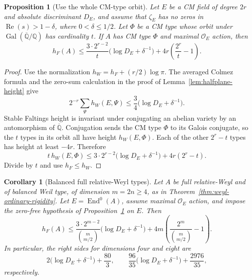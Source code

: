 \documentclass[11pt]{article}
\newtheorem{proposition}[theorem]{Proposition}
\newtheorem{corollary}[theorem]{Corollary}
\theoremstyle{definition}
\theoremstyle{remark}
\begin{document}
\begin{proposition}[Use the whole CM-type orbit]
\label{prop:cm-type-orbit-height}
Let $E$ be a CM field of degree $2r$ and absolute discriminant $D_E$,
and assume that $\zeta_E$ has no zeros in
$\operatorname{Re}(s)>1-\delta$, where $0<\delta\leq1/2$.
Let $\Phi$ be a CM type whose orbit under
$\operatorname{Gal}(\overline{\mathbb Q}/\mathbb Q)$ has cardinality
$t$.  If $A$ has CM type $\Phi$ and maximal $\mathcal O_E$ action,
then
\begin{equation}
 \label{eq:cm-type-orbit-height}
 h_F(A)\leq
 \frac{3\cdot2^{r-2}}{t}
       \bigl(\log D_E+\delta^{-1}\bigr)
 +4r\left(\frac{2^r}{t}-1\right).
\end{equation}
\end{proposition}

\begin{proof}
Use the normalization $h_W=h_F+(r/2)\log\pi$.
The averaged Colmez formula and the zero-sum calculation in the
proof of Lemma~\ref{lem:halfplane-height} give
\[
 2^{-r}\sum_{\Psi}h_W(E,\Psi)
 \leq\frac34\bigl(\log D_E+\delta^{-1}\bigr).
\]
Stable Faltings height is invariant under conjugating an abelian
variety by an automorphism of $\overline{\mathbb Q}$.  Conjugation
sends the CM type $\Phi$ to its Galois conjugate, so the $t$ types
in its orbit all have height $h_W(E,\Phi)$.  Each of the other
$2^r-t$ types has height at least $-4r$.  Therefore
\[
 t\,h_W(E,\Phi)
 \leq3\cdot2^{r-2}\bigl(\log D_E+\delta^{-1}\bigr)
       +4r(2^r-t).
\]
Divide by $t$ and use $h_F\leq h_W$.
\end{proof}

\begin{corollary}[Balanced full relative-Weyl types]
\label{cor:balanced-weyl-height}
Let $A$ be full relative-Weyl and of balanced Weil type, of dimension
$m=2n\geq4$, as in Theorem~\ref{thm:weyl-ordinary-rigidity}.
Let $E=\operatorname{End}^0(A)$, assume maximal $\mathcal O_E$
action, and impose the zero-free hypothesis of
Proposition~\ref{prop:cm-type-orbit-height} on $E$.
Then
\begin{equation}
 \label{eq:balanced-weyl-height}
 h_F(A)\leq
 \frac{3\cdot2^{m-2}}{\binom{m}{m/2}}
       \bigl(\log D_E+\delta^{-1}\bigr)
 +4m\left(\frac{2^m}{\binom{m}{m/2}}-1\right).
\end{equation}
In particular, the right sides for dimensions four and eight are
\[
 2\bigl(\log D_E+\delta^{-1}\bigr)+\frac{80}{3},
 \qquad
 \frac{96}{35}\bigl(\log D_E+\delta^{-1}\bigr)
       +\frac{2976}{35},
\]
respectively.
\end{corollary}
\end{document}
